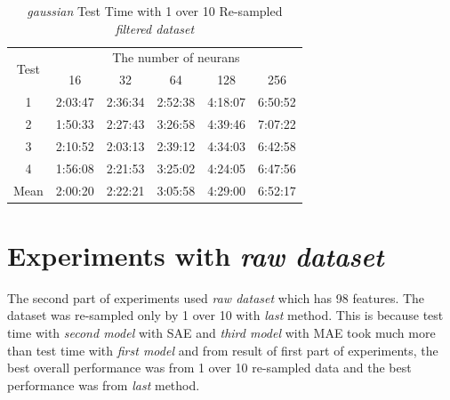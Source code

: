 \documentclass[draft,dvipsnames]{drexel-thesis}
\begin{document}
\begin{thesis}
\begin{table}[!t]
\centering
\caption{{\em gaussian} Test Time with 1 over 10 Re-sampled {\em filtered dataset}}
\label{tbl:gaussian_1_10_time}
\begin{tabular}{|c|c|c|c|c|c|}
\hline
\multirow{2}{*}{Test}      & \multicolumn{5}{c|}{The number of neurans}                                                                                                               \\ \cline{2-6} 
                           & 16                           & 32                           & 64                           & 128                          & 256                          \\ \hline
1                          & 2:03:47                      & 2:36:34                      & 2:52:38                      & 4:18:07                      & 6:50:52                      \\ \hline
2                          & 1:50:33                      & 2:27:43                      & 3:26:58                      & 4:39:46                      & 7:07:22                      \\ \hline
3                          & 2:10:52                      & 2:03:13                      & 2:39:12                      & 4:34:03                      & 6:42:58                      \\ \hline
4                          & 1:56:08                      & 2:21:53                      & 3:25:02                      & 4:24:05                      & 6:47:56                      \\ \hline
\multicolumn{1}{|l|}{Mean} & \multicolumn{1}{l|}{2:00:20} & \multicolumn{1}{l|}{2:22:21} & \multicolumn{1}{l|}{3:05:58} & \multicolumn{1}{l|}{4:29:00} & \multicolumn{1}{l|}{6:52:17} \\ \hline
\end{tabular}
\end{table}


\section{Experiments with {\em raw dataset}}
The second part of experiments used {\em raw dataset} which has 98 features. The dataset was re-sampled only by 1 over 10 with {\em last} method. This is because test time with {\em second model} with SAE and {\em third model} with MAE took much more than test time with {\em first model} and from result of first part of experiments, the best overall performance was from 1 over 10 re-sampled data and the best performance was from {\em last} method.


\end{thesis}
\end{document}
